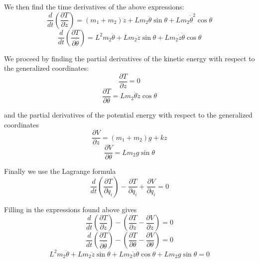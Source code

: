 We then find the time derivatives of the above expressions:
\[
\frac{d}{dt} \left( \frac{\partial T}{\partial \dot{z}} \right) = (m_1 + m_2) \ddot{z} + L m_2 \ddot{\theta} \sin \theta + L m_2 \dot{\theta}^2 \cos \theta
\]
\[
\frac{d}{dt} \left( \frac{\partial T}{\partial \dot{\theta}} \right) = L^2 m_2 \ddot{\theta} + L m_2 \ddot{z} \sin \theta + L m_2 \dot{z} \dot{\theta} \cos \theta
\]

We proceed by finding the partial derivatives of the kinetic energy with respect to the generalized coordinates:
\[
\frac{\partial T}{\partial z} = 0
\]
\[
\frac{\partial T}{\partial \theta} = L m_2 \dot{\theta} \dot{z} \cos \theta
\]

and the partial derivatives of the potential energy with respect to the generalized coordinates
\[
\frac{\partial V}{\partial z} = (m_1 + m_2) g + k z
\]
\[
\frac{\partial V}{\partial \theta} = L m_2 g \sin \theta
\]

Finally we use the Lagrange formula
\[
\frac{d}{dt} \left( \frac{\partial T}{\partial \dot{q}_i} \right) - \frac{\partial T}{\partial q_i} + \frac{\partial V}{\partial q_i} = 0
\]

Filling in the expressions found above gives
\[
\frac{d}{dt} \left( \frac{\partial T}{\partial \dot{z}} \right) - \left( \frac{\partial T}{\partial z} - \frac{\partial V}{\partial z} \right) = 0
\]
\[
\frac{d}{dt} \left( \frac{\partial T}{\partial \dot{\theta}} \right) - \left( \frac{\partial T}{\partial \theta} - \frac{\partial V}{\partial \theta} \right) = 0
\]
\[
L^2 m_2 \ddot{\theta} + L m_2 \ddot{z} \sin \theta + L m_2 \dot{z} \dot{\theta} \cos \theta + L m_2 g \sin \theta = 0
\]


